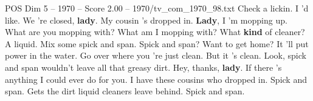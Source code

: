 \begin{textsample}{POS Dim 5 – 1970 – Score 2.00 – 1970/tv\_com\_1970\_98.txt}  \label{ex:f5_pos_052}
Check a lickin.
I 'd like.
We 're closed, \textbf{lady}.
My cousin 's dropped in. \textbf{Lady}, I 'm mopping up.
What are you mopping with?
What am I mopping with?
What \textbf{kind} of cleaner?
A liquid.
Mix some spick and span.
Spick and span?
Want to get home?
It 'll put power in the water.
Go over where you 're just clean.
But it 's clean.
Look, spick and span wouldn't leave all that greasy dirt.
Hey, thanks, \textbf{lady}.
If there 's anything I could ever do for you.
I have these cousins who dropped in.
Spick and span.
Gets the dirt liquid cleaners leave behind.
Spick and span.

\end{textsample}
